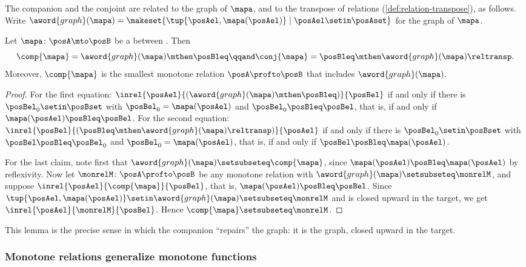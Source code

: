 The companion and the conjoint are related to the graph of $\mapa$, and to the transpose of relations (\cref{def:relation-transpose}), as follows.
Write $\aword{graph}(\mapa) = \makeset{\tup{\posAel, \mapa(\posAel)} \mid \posAel \setin \posAset}$ for the graph of $\mapa$.

\begin{lemma}
    \label{lem:companion-via-graph}
    Let $\mapa \colon \posA \mto \posB$ be a  between .
    Then
    \begin{equation}
        \comp{\mapa} = \aword{graph}(\mapa) \mthen \posBleq
        \qqand
        \conj{\mapa} = \posBleq \mthen \aword{graph}(\mapa)\reltransp.
    \end{equation}
    Moreover, $\comp{\mapa}$ is the smallest monotone relation $\posA \profto \posB$ that includes $\aword{graph}(\mapa)$.
\end{lemma}
\begin{proof}
    For the first equation: $\inrel{\posAel}{(\aword{graph}(\mapa) \mthen \posBleq)}{\posBel}$ if and only if there is $\posBel_0 \setin \posBset$ with $\posBel_0 = \mapa(\posAel)$ and $\posBel_0 \posBleq \posBel$, that is, if and only if $\mapa(\posAel) \posBleq \posBel$.
    For the second equation: $\inrel{\posBel}{(\posBleq \mthen \aword{graph}(\mapa)\reltransp)}{\posAel}$ if and only if there is $\posBel_0 \setin \posBset$ with $\posBel \posBleq \posBel_0$ and $\posBel_0 = \mapa(\posAel)$, that is, if and only if $\posBel \posBleq \mapa(\posAel)$.

    For the last claim, note first that $\aword{graph}(\mapa) \setsubseteq \comp{\mapa}$, since $\mapa(\posAel) \posBleq \mapa(\posAel)$ by reflexivity.
    Now let $\monrelM \colon \posA \profto \posB$ be any monotone relation with $\aword{graph}(\mapa) \setsubseteq \monrelM$, and suppose $\inrel{\posAel}{\comp{\mapa}}{\posBel}$, that is, $\mapa(\posAel) \posBleq \posBel$.
    Since $\tup{\posAel, \mapa(\posAel)} \setin \aword{graph}(\mapa) \setsubseteq \monrelM$ and \monrelM is closed upward in the target, we get $\inrel{\posAel}{\monrelM}{\posBel}$.
    Hence $\comp{\mapa} \setsubseteq \monrelM$.
\end{proof}

This lemma is the precise sense in which the companion ``repairs'' the graph: it is the graph, closed upward in the target.

\subsubsection{Monotone relations generalize monotone functions}

